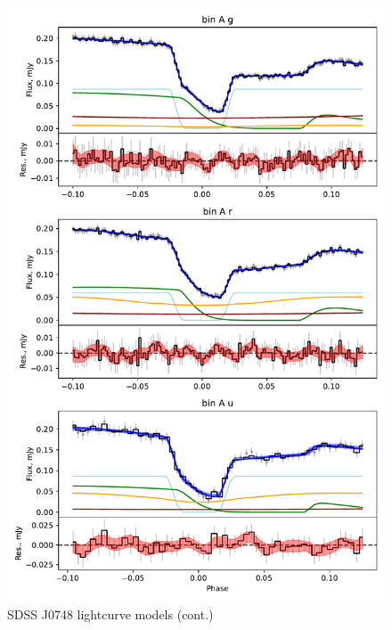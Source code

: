 \begin{figure}
    \centering
    \includegraphics[width=\textwidth]{figures/results/SDSS0748/SDSS0748_2.pdf}
    \caption{SDSS J0748 lightcurve models (cont.)}
    \label{fig:SDSS J0748 all lightcurves cont 1}
\end{figure}
